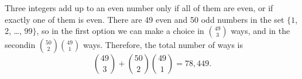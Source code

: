 Three integers add up to an even number only if all of them are even, or if exactly one of them is even.
There are 49 even and 50 odd numbers in the set $\{1$, 2, \dots, $99\}$, so in the first option we can make a choice in $\binom{49}{3}$ ways, and in the second\dash in $\binom{50}{2}\binom{49}{1}$ ways.
Therefore, the total number of ways is
\[
    \binom{49}{3}+\binom{50}{2}\binom{49}{1} = 78{,}449.
\]
